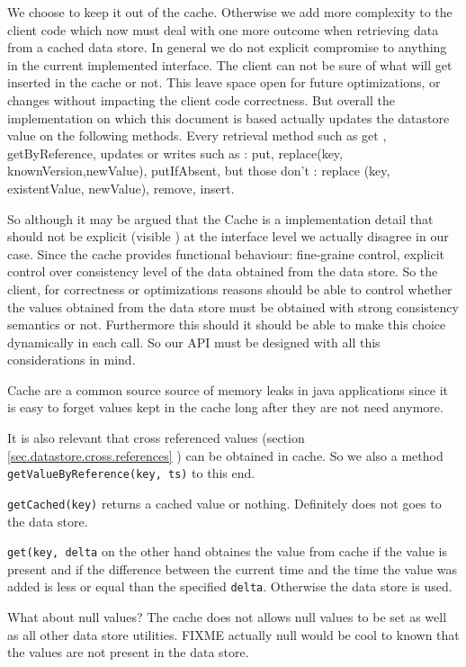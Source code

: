 We choose to keep it out of the cache. Otherwise we add more
complexity to the client code which now must deal with one more outcome
when retrieving data from a cached data store. In general we do not
explicit compromise to anything in the current implemented
interface. The client can not be sure of what will get inserted in the
cache or not. This leave space open for future optimizations, or
changes  without impacting the client code correctness. But overall
the implementation on which this document is based actually updates
the datastore value on the following methods. Every retrieval method
such as get , getByReference, 
updates or writes such as : put,  replace(key, knownVersion,newValue),
putIfAbsent,    
but those don't : replace (key, existentValue, newValue), remove,
insert. 

So although it may be argued that the Cache is a implementation detail
that should not be explicit (visible ) at the interface level we
actually disagree in our case. Since the cache provides functional
behaviour: fine-graine control, explicit control over consistency
level of the data obtained from the data store. So the client, for
correctness or optimizations reasons should be able to control whether
the values obtained from the data store must be obtained with strong
consistency semantics or not. Furthermore this should it should be
able to make this choice dynamically in each call.  So our API must be
designed with all this considerations in mind. 

Cache are a common source  source of memory leaks \cite{joshua98}  in java
applications since it is easy to forget values kept in the cache long
after they are not need anymore.  

It is also relevant that cross referenced values (section
\ref{sec.datastore.cross.references} ) can be obtained in cache. So we
also a method \texttt{getValueByReference(key, ts)} to this end. 

\texttt{getCached(key)}  returns a cached value or nothing. Definitely
does not goes to the data store. 

\texttt{get(key, delta} on the other hand obtaines the value from cache
if the value is present and if the  difference between the current time and the time the value was
added  is less or equal than the specified \texttt{delta}. Otherwise
the data store is used. 

What about null values? The cache does not allows null values to be
set as well as all other data store utilities.  FIXME actually null
would be cool to known that the values are not present in the data
store. 

